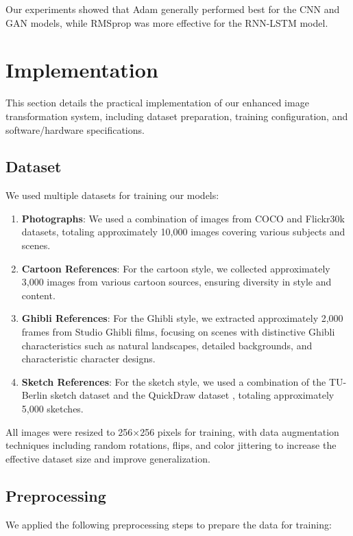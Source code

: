\documentclass[conference]{IEEEtran}
\begin{document}
Our experiments showed that Adam generally performed best for the CNN and GAN models, while RMSprop was more effective for the RNN-LSTM model.

\section{Implementation}
This section details the practical implementation of our enhanced image transformation system, including dataset preparation, training configuration, and software/hardware specifications.

\subsection{Dataset}
We used multiple datasets for training our models:

\begin{enumerate}
    \item \textbf{Photographs}: We used a combination of images from COCO \cite{lin2014microsoft} and Flickr30k \cite{young2014image} datasets, totaling approximately 10,000 images covering various subjects and scenes.
    
    \item \textbf{Cartoon References}: For the cartoon style, we collected approximately 3,000 images from various cartoon sources, ensuring diversity in style and content.
    
    \item \textbf{Ghibli References}: For the Ghibli style, we extracted approximately 2,000 frames from Studio Ghibli films, focusing on scenes with distinctive Ghibli characteristics such as natural landscapes, detailed backgrounds, and characteristic character designs.
    
    \item \textbf{Sketch References}: For the sketch style, we used a combination of the TU-Berlin sketch dataset \cite{eitz2012humans} and the QuickDraw dataset \cite{ha2017neural}, totaling approximately 5,000 sketches.
\end{enumerate}

All images were resized to 256×256 pixels for training, with data augmentation techniques including random rotations, flips, and color jittering to increase the effective dataset size and improve generalization.

\subsection{Preprocessing}
We applied the following preprocessing steps to prepare the data for training:
\end{document}
